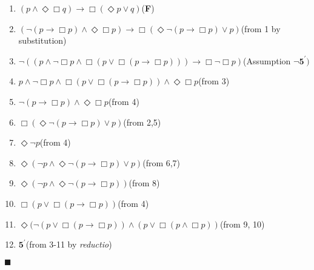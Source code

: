 \documentclass[11pt]{article}
\begin{document}
\begin{enumerate}
\item{$(p\wedge \Diamond\Box q) \rightarrow \Box (\Diamond{p}\vee q)$\tab\tab\tab(\textbf{F})}
\item{$(\neg (p\rightarrow \Box p) \wedge \Diamond\Box p) \rightarrow \Box (\Diamond\neg (p\rightarrow \Box p)\vee p)$\tab(from 1 by substitution)}
\item{$\neg ((p \wedge \neg \Box p \wedge \Box (p \vee \Box (p \rightarrow \Box p))) \rightarrow \Box \neg \Box p)$\tab(Assumption $\neg \textbf{5}^\prime)$}
\item{$p \wedge \neg \Box p \wedge \Box (p \vee \Box (p \rightarrow \Box p)) \wedge \Diamond\Box p$\tab\tab(from 3)}
\item{$\neg (p\rightarrow \Box p) \wedge \Diamond\Box p$\tab\tab\tab\tab(from 4)}
\item{$\Box (\Diamond\neg (p\rightarrow \Box p)\vee p)$\tab\tab\tab(from 2,5)}
\item{$\Diamond\neg p$\tab\tab\tab\tab\tab(from 4)}
\item{$\Diamond(\neg p \wedge \Diamond\neg (p\rightarrow \Box p)\vee p)$\tab\tab\tab(from 6,7)}
\item{$\Diamond(\neg p \wedge \Diamond\neg (p\rightarrow \Box p))$\tab\tab\tab(from 8)}
\item{$\Box (p \vee \Box (p \rightarrow \Box p))$\tab\tab\tab\tab(from 4)}
\item{$\Diamond(\neg (p\vee \Box (p\rightarrow \Box p)) \wedge (p\vee \Box (p\wedge \Box p))$\tab(from 9, 10)}
\item{$\textbf{5}^\prime$\tab\tab\tab\tab\tab(from 3-11 by \textit{reductio})}
\end{enumerate}
$\blacksquare$
\end{document}
